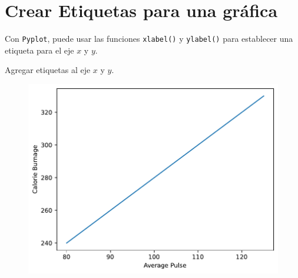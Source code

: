 \section{Crear Etiquetas para una gráfica}

Con \texttt{Pyplot}, puede usar las funciones \texttt{xlabel()} y
\texttt{ylabel()} para establecer una etiqueta para el eje \(x\) y
\(y\).

\begin{code} Agregar etiquetas al eje \(x\) y \(y\).

\begin{Shaded}
\begin{Highlighting}[]

\OperatorTok{=}\NormalTok{ np.array([}\NormalTok{, }\NormalTok{, }\NormalTok{, }\NormalTok{, }\NormalTok{, }\NormalTok{, }\NormalTok{, }\NormalTok{, }\NormalTok{, }\NormalTok{])}
\OperatorTok{=}\NormalTok{ np.array([}\NormalTok{, }\NormalTok{, }\NormalTok{, }\NormalTok{, }\NormalTok{, }\NormalTok{, }\NormalTok{, }\NormalTok{, }\NormalTok{, }\NormalTok{])}


\NormalTok{)}
\NormalTok{)}

\end{Highlighting}
\end{Shaded}

\begin{figure}
  \centering
  \includegraphics[scale=0.6]{img/grafica1023.pdf}
\end{figure}
\end{code}

